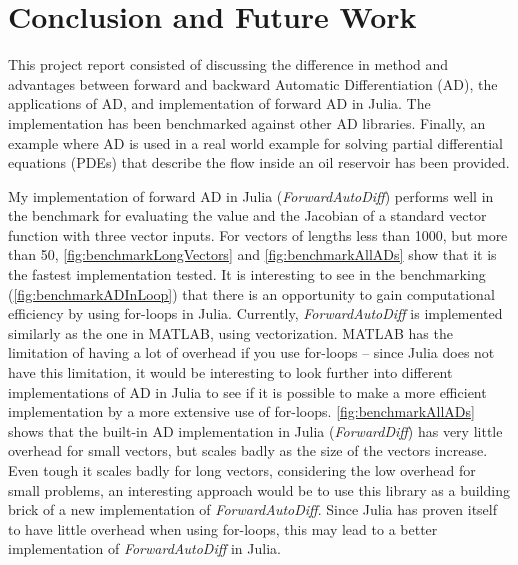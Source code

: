 \chapter{Conclusion and Future Work}
\label{ch:Conclusion}
This project report consisted of discussing the difference in method and advantages between forward and backward Automatic Differentiation (AD), the applications of AD, and implementation of forward AD in Julia. The implementation has been benchmarked against other AD libraries. Finally, an example where AD is used in a real world example for solving partial differential equations (PDEs) that describe the flow inside an oil reservoir has been provided.

My implementation of forward AD in Julia (\textit{ForwardAutoDiff}) performs well in the benchmark for evaluating the value and the Jacobian of a standard vector function with three vector inputs. For vectors of lengths less than 1000, but more than 50, \autoref{fig:benchmarkLongVectors} and \autoref{fig:benchmarkAllADs} show that it is the fastest implementation tested. It is interesting to see in the benchmarking (\autoref{fig:benchmarkADInLoop}) that there is an opportunity to gain computational efficiency by using for-loops in Julia. Currently, \textit{ForwardAutoDiff} is implemented similarly as the one in MATLAB, using vectorization. MATLAB has the limitation of having a lot of overhead if you use for-loops -- since Julia does not have this limitation, it would be interesting to look further into different implementations of AD in Julia to see if it is possible to make a more efficient implementation by a more extensive use of for-loops. \autoref{fig:benchmarkAllADs} shows that the built-in AD implementation in Julia (\textit{ForwardDiff}) has very little overhead for small vectors, but scales badly as the size of the vectors increase. Even tough it scales badly for long vectors, considering the low overhead for small problems, an interesting approach would be to use this library as a building brick of a new implementation of \textit{ForwardAutoDiff}. Since Julia has proven itself to have little overhead when using for-loops, this may lead to a better implementation of \textit{ForwardAutoDiff} in Julia.

